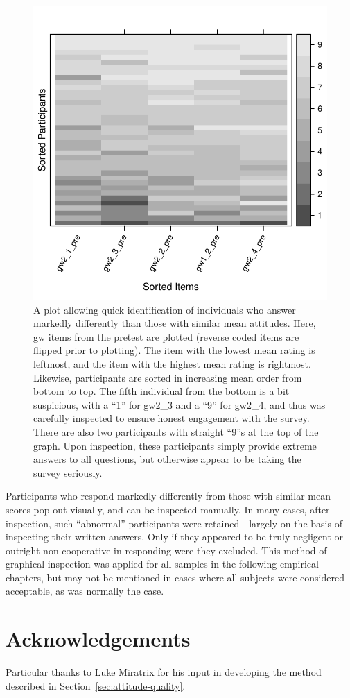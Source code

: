 \begin{figure}
    \begin{center}
        \includegraphics{consistency.pdf}
    \end{center}
    \caption{A plot allowing quick identification of individuals who answer
        markedly differently than those with similar mean attitudes. Here,
        \textsf{gw} items from the pretest are plotted (reverse coded items are
        flipped prior to plotting). The item with the lowest mean rating is
        leftmost, and the item with the highest mean rating is rightmost.
        Likewise, participants are sorted in increasing mean order from bottom
        to top. The fifth individual from the bottom is a bit suspicious, with a
        “1” for \textsf{gw2_3} and a “9” for \textsf{gw2_4}, and thus was
        carefully inspected to ensure honest engagement with the survey. There
        are also two participants with straight “9”s at the top of the graph.
        Upon inspection, these participants simply provide extreme answers to
        all questions, but otherwise appear to be taking the survey seriously.}
    \label{fig:consistency}
\end{figure}

Participants who respond markedly differently from those with similar mean
scores pop out visually, and can be inspected manually. In many cases, after
inspection, such “abnormal” participants were retained---largely on the basis of
inspecting their written answers. Only if they appeared to be truly negligent or
outright non-cooperative in responding were they excluded. This method of
graphical inspection was applied for all samples in the following empirical
chapters, but may not be mentioned in cases where all subjects were considered
acceptable, as was normally the case.


\section*{Acknowledgements}

Particular thanks to Luke Miratrix for his input in developing the method
described in Section~\ref{sec:attitude-quality}.
